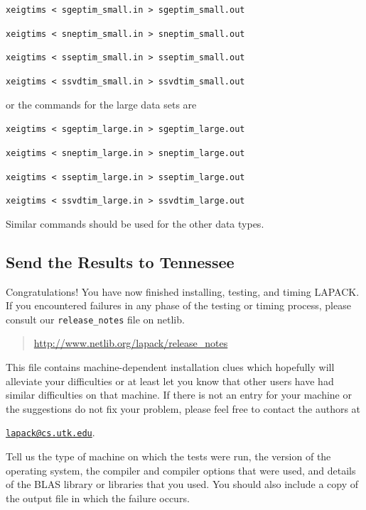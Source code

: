 \documentclass[11pt]{report}
\begin{document}
\begin{itemize}
\begin{list}{}{}
\item{} \texttt{xeigtims < sgeptim\_small.in > sgeptim\_small.out }
\item{} \texttt{xeigtims < sneptim\_small.in > sneptim\_small.out }
\item{} \texttt{xeigtims < sseptim\_small.in > sseptim\_small.out }
\item{} \texttt{xeigtims < ssvdtim\_small.in > ssvdtim\_small.out }
\end{list}
or the commands for the large data sets are
\begin{list}{}{}
\item{} \texttt{xeigtims < sgeptim\_large.in > sgeptim\_large.out }
\item{} \texttt{xeigtims < sneptim\_large.in > sneptim\_large.out }
\item{} \texttt{xeigtims < sseptim\_large.in > sseptim\_large.out }
\item{} \texttt{xeigtims < ssvdtim\_large.in > ssvdtim\_large.out }
\end{list}

\noindent
Similar commands should be used for the other data types.
\end{itemize}

\subsection{Send the Results to Tennessee}\label{sendresults}

Congratulations!  You have now finished installing, testing, and
timing LAPACK.  If you encountered failures in any phase of the 
testing or timing process, please
consult our \texttt{release\_notes} file on netlib.
\begin{quote}
\url{http://www.netlib.org/lapack/release\_notes}
\end{quote}
This file contains machine-dependent installation clues which hopefully will 
alleviate your difficulties or at least let you know that other users
have had similar difficulties on that machine.  If there is not an entry
for your machine or the suggestions do not fix your problem, please feel
free to contact the authors at
\begin{list}{}{}
\item \href{mailto:lapack@cs.utk.edu}{\texttt{lapack@cs.utk.edu}}.
\end{list}
Tell us the 
type of machine on which the tests were run, the version of the operating
system, the compiler and compiler options that were used,
and details of the BLAS library or libraries that you used.  You should
also include a copy of the output file in which the failure occurs.
\end{document}
